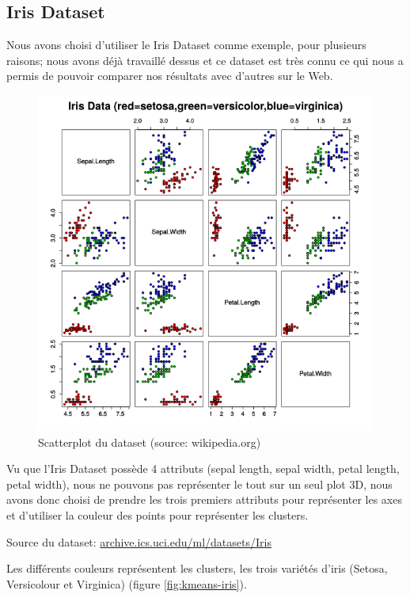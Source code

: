 \documentclass{article}
\begin{document}
  \subsection{Iris Dataset}

  Nous avons choisi d'utiliser le Iris Dataset comme exemple, pour plusieurs raisons;
  nous avons déjà travaillé dessus et ce dataset est très connu ce qui nous a permis de
  pouvoir comparer nos résultats avec d'autres sur le Web.

  \begin{figure}[h]
    \centering
    \includegraphics[scale=0.5]{images/Iris_dataset_scatterplot.png}
    \caption{Scatterplot du dataset (source: wikipedia.org)}
    \label{fig:scatterplot-wiki}
  \end{figure}

  Vu que l'Iris Dataset possède 4 attributs (sepal length, sepal width, petal length, petal width),
  nous ne pouvons pas représenter le tout sur un seul plot 3D, nous avons donc choisi de prendre les trois premiers attributs
  pour représenter les axes
  et d'utiliser la couleur des points pour représenter les clusters.

  Source du dataset: \url{archive.ics.uci.edu/ml/datasets/Iris}

  \newpage
  Les différents couleurs représentent les clusters, les trois variétés d'iris (Setosa, Versicolour et Virginica) (figure \ref{fig:kmeans-iris}).
\end{document}

